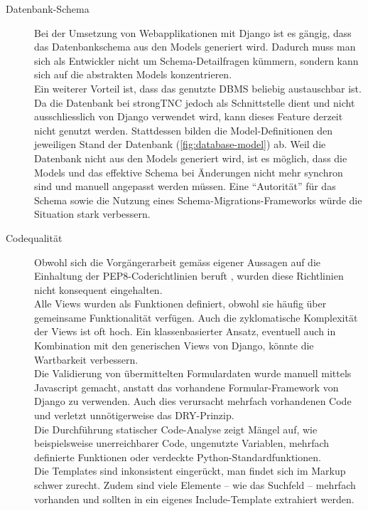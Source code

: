 \begin{description}
	\item[Datenbank-Schema] Bei der Umsetzung von Webapplikationen mit Django ist es
	gängig, dass das Datenbankschema aus den Models generiert wird. Dadurch muss man
	sich als Entwickler nicht um Schema-Detailfragen kümmern, sondern kann sich auf
	die abstrakten Models konzentrieren.\\
	Ein weiterer Vorteil ist, dass das genutzte DBMS beliebig austauschbar ist. Da
	die Datenbank bei strongTNC jedoch als Schnittstelle dient und nicht
	ausschliesslich von Django verwendet wird, kann dieses Feature derzeit nicht
	genutzt werden. Stattdessen bilden die Model-Definitionen den jeweiligen Stand
	der Datenbank (\autoref{fig:database-model}) ab. Weil die Datenbank nicht aus
	den Models generiert wird, ist es möglich, dass die Models und das effektive
	Schema bei Änderungen nicht mehr synchron sind und manuell angepasst werden
	müssen. Eine \enquote{Autorität} für das Schema sowie die Nutzung eines
	Schema-Migrations-Frameworks würde die Situation stark verbessern.
	
	\item[Codequalität] Obwohl sich die Vorgängerarbeit gemäss eigener Aussagen auf
	die Einhaltung der PEP8-Coderichtlinien\cite{PEP8:2001} beruft
	\cite[S.~79]{cygnet:2013}, wurden diese Richtlinien nicht konsequent
	eingehalten. \\
	Alle Views wurden als Funktionen definiert, obwohl sie häufig über gemeinsame
	Funktionalität verfügen. Auch die zyklomatische Komplexität der Views ist oft
	hoch. Ein klassenbasierter Ansatz, eventuell auch in Kombination mit den
	generischen Views von Django, könnte die Wartbarkeit verbessern.\\
	Die Validierung von übermittelten Formulardaten wurde manuell mittels Javascript
	gemacht, anstatt das vorhandene Formular-Framework von Django zu verwenden.
	Auch dies verursacht mehrfach vorhandenen Code und verletzt unnötigerweise das
	DRY-Prinzip\cite[S.~26--27]{hunt1999pragmatic}. \\
	Die Durchführung statischer Code-Analyse zeigt Mängel auf, wie
	beispielsweise unerreichbarer Code, ungenutzte Variablen, mehrfach definierte
	Funktionen oder verdeckte Python-Standardfunktionen. \\
	Die Templates sind inkonsistent eingerückt, man findet sich im Markup schwer
	zurecht. Zudem sind viele Elemente -- wie \zb das Suchfeld -- mehrfach
	vorhanden und sollten in ein eigenes Include-Template extrahiert werden.

\end{description}

